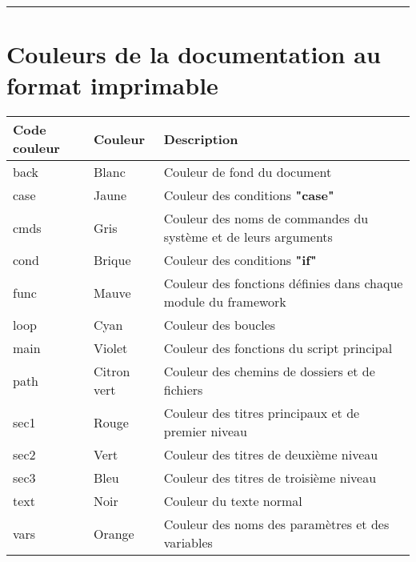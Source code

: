 \documentclass[a4paper,10pt]{article}
\begin{document}
\newpage





\color{sec1}\par\noindent\rule{\textwidth}{0.4pt}\color{text}

\color{red}
\section{Couleurs de la documentation au format imprimable}\color{text}

\begin{justify}
    \begin{tabular}{|l|l|l|}
        \hline
        \textbf{Code couleur} & \textbf{Couleur}    & \textbf{Description}\\
        \hline
        \color{text}back  & \color{text}Blanc       & \color{text}Couleur de fond du document\\
        \hline
        \color{case}case  & \color{case}Jaune       & \color{case}Couleur des conditions \textbf{"case"}\\
        \hline
        \color{cmds}cmds  & \color{cmds}Gris        & \color{cmds}Couleur des noms de commandes du système et de leurs arguments\\
        \hline
        \color{cond}cond  & \color{cond}Brique      & \color{cond}Couleur des conditions \textbf{"if"}\\
        \hline
        \color{func}func  & \color{func}Mauve       & \color{func}Couleur des fonctions définies dans chaque module du framework\\
        \hline
        \color{loop}loop  & \color{loop}Cyan        & \color{loop}Couleur des boucles\\
        \hline
        \color{main}main  & \color{main}Violet      & \color{main}Couleur des fonctions du script principal\\
        \hline
        \color{path}path  & \color{path}Citron vert & \color{path}Couleur des chemins de dossiers et de fichiers\\
        \hline
        \color{sec1}sec1  & \color{sec1}Rouge       & \color{sec1}Couleur des titres principaux et de premier niveau\\
        \hline
        \color{sec2}sec2  & \color{sec2}Vert        & \color{sec2}Couleur des titres de deuxième niveau\\
        \hline
        \color{sec3}sec3  & \color{sec3}Bleu        & \color{sec3}Couleur des titres de troisième niveau\\
        \hline
        \color{text}text  & \color{text}Noir        & \color{text}Couleur du texte normal\\
        \hline
        \color{vars}vars  & \color{vars}Orange      & \color{vars}Couleur des noms des paramètres et des variables\\
        \hline

    \end{tabular}
\end{justify}
\end{document}

